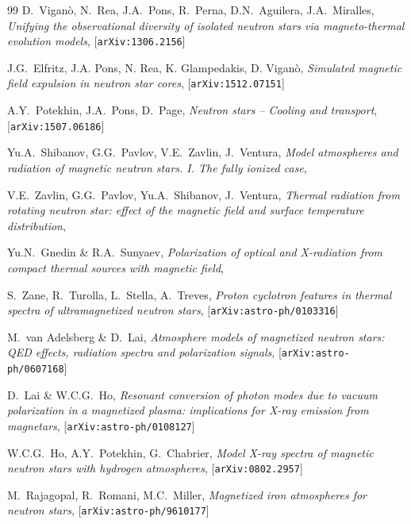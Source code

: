 \documentclass{pos1}
\begin{document}
\begin{thebibliography}{99}
D.~Vigan\`o, N.~Rea, J.A.~Pons, R.~Perna, D.N.~Aguilera, J.A.~Miralles,
\textit{Unifying the observational diversity of isolated neutron stars via magneto-thermal evolution models},
[\texttt{arXiv:1306.2156}]

J.G.~Elfritz, J.A. Pons, N. Rea, K. Glampedakis, D. Vigan\`o,
\textit{Simulated magnetic field expulsion in neutron star cores},
[\texttt{arXiv:1512.07151}]

A.Y.~Potekhin, J.A.~Pons, D.~Page,
\textit{Neutron stars -- Cooling and transport},
[\texttt{arXiv:1507.06186}]

Yu.A.~Shibanov, G.G.~Pavlov, V.E.~Zavlin, J.~Ventura,
\textit{Model atmospheres and radiation of magnetic neutron stars. I. The fully ionized case},

V.E.~Zavlin, G.G.~Pavlov, Yu.A.~Shibanov, J.~Ventura,
\textit{Thermal radiation from rotating neutron star: effect of the magnetic field and surface temperature distribution},

Yu.N.~Gnedin \& R.A.~Sunyaev,
\textit{Polarization of optical and X-radiation from compact thermal sources with magnetic field},

S.~Zane, R.~Turolla, L.~Stella, A.~Treves,
\textit{Proton cyclotron features in thermal spectra of ultramagnetized neutron stars},
[\texttt{arXiv:astro-ph/0103316}]

M.~van Adelsberg \& D.~Lai,
\textit{Atmosphere models of magnetized neutron stars: QED effects, radiation spectra and polarization signals},
[\texttt{arXiv:astro-ph/0607168}]

D.~Lai \& W.C.G.~Ho,
\textit{Resonant conversion of photon modes due to vacuum polarization in a magnetized plasma: implications for X-ray emission from magnetars},
[\texttt{arXiv:astro-ph/0108127}]

W.C.G.~Ho, A.Y.~Potekhin, G.~Chabrier,
\textit{Model X-ray spectra of magnetic neutron  stars with hydrogen atmospheres},
[\texttt{arXiv:0802.2957}]

M.~Rajagopal, R.~Romani, M.C.~Miller,
\textit{Magnetized iron atmospheres for neutron stars},
[\texttt{arXiv:astro-ph/9610177}]


\end{thebibliography}
\end{document}
